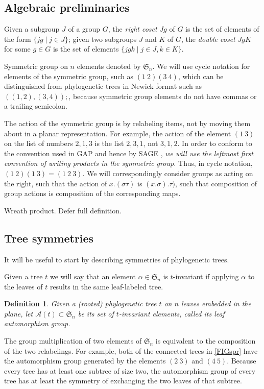 \documentclass{amsart}
\newtheorem{definition}{Definition}
\newcommand{\fS}{\mathfrak S}
\newcommand{\aut}{\mathcal A}
\begin{document}
\subsection{Algebraic preliminaries}
Given a subgroup $J$ of a group $G$, the \emph{right coset} $Jg$ of $G$ is the set of elements of the form $\{jg \mid j \in J\}$;
given two subgroups $J$ and $K$ of $G$, the \emph{double coset} $JgK$ for some $g \in G$ is the set of elements $\{jgk \mid j \in J, k \in K\}$.

Symmetric group on $n$ elements denoted by $\fS_n$.
We will use cycle notation for elements of the symmetric group, such as $(1\ 2) (3\ 4)$, which can be distinguished from phylogenetic trees in Newick format \cite{wiki:newick} such as $((1,2),(3,4));$, because symmetric group elements do not have commas or a trailing semicolon.

The action of the symmetric group is by relabeling items, not by moving them about in a planar representation.
For example, the action of the element $(1\ 3)$ on the list of numbers $2, 1, 3$ is the list $2, 3, 1$, not $3, 1, 2$.
In order to conform to the convention used in GAP \cite{GAP4} and hence by SAGE \cite{SteinJoyner2005}, \emph{we will use the leftmost first convention of writing products in the symmetric group.}
Thus, in cycle notation, $(1\ 2) (1\ 3) = (1\ 2\ 3)$.
We will correspondingly consider groups as acting on the right, such that the action of $x.(\sigma \tau)$ is $(x.\sigma).\tau)$, such that composition of group actions is composition of the corresponding maps.

Wreath product.
Defer full definition.


\subsection{Tree symmetries}
It will be useful to start by describing symmetries of phylogenetic trees.

Given a tree $t$ we will say that an element $\alpha \in \fS_n$ is $t$-invariant if applying $\alpha$ to the leaves of $t$ results in the same leaf-labeled tree.
\begin{definition}
Given a (rooted) phylogenetic tree $t$ on $n$ leaves embedded in the plane, let $\aut(t) \subset \fS_n$ be its set of $t$-invariant elements, called its leaf automorphism group.
\end{definition}
The group multiplication of two elements of $\fS_n$ is equivalent to the composition of the two relabelings.
For example, both of the connected trees in \ref{FIGspr} have the automorphism group generated by the elements $(2\ 3)$ and $(4\ 5)$.
Because every tree has at least one subtree of size two, the automorphism group of every tree has at least the symmetry of exchanging the two leaves of that subtree.
\end{document}

